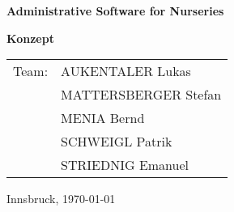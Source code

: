 \thispagestyle{empty}

\begin{center}
  \textbf{\LARGE Administrative Software for Nurseries}
\end{center}
\vspace{10cm}

\begin{flushleft}
\textbf{\LARGE Konzept}

\vspace{3cm}
\begin{table}[htbp]
\Large
\begin{tabular}{cl}
   Team: & AUKENTALER Lukas \\ 
   & MATTERSBERGER Stefan \\ 
   & MENIA Bernd \\
   & SCHWEIGL Patrik \\
   & STRIEDNIG Emanuel \\
 \end{tabular}
\end{table}
\end{flushleft}

\large Innsbruck, \today

\vfill